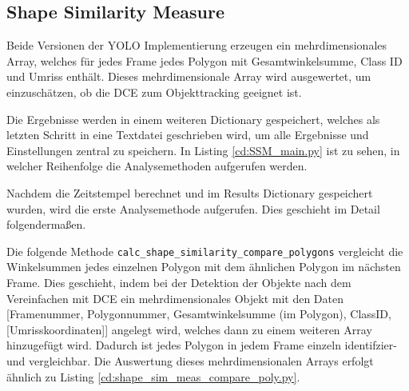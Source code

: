 \subsection{Shape Similarity Measure}{
	\label{py:Shape_Sim_Meas}
	Beide Versionen der YOLO Implementierung erzeugen ein mehrdimensionales Array, welches für jedes Frame jedes Polygon mit Gesamtwinkelsumme, Class ID und Umriss enthält. Dieses mehrdimensionale Array wird ausgewertet, um einzuschätzen, ob die DCE zum Objekttracking geeignet ist. 

	Die Ergebnisse werden in einem weiteren Dictionary gespeichert, welches als letzten Schritt in eine Textdatei geschrieben wird, um alle Ergebnisse und Einstellungen zentral zu speichern. In Listing \ref{cd:SSM_main.py} ist zu sehen, in welcher Reihenfolge die Analysemethoden aufgerufen werden. 
	
	Nachdem die Zeitstempel berechnet und im Results Dictionary gespeichert wurden, wird die erste Analysemethode aufgerufen. Dies geschieht im Detail folgendermaßen.

	Die folgende Methode \lstinline|calc_shape_similarity_compare_polygons| vergleicht die Winkelsummen jedes einzelnen Polygon mit dem ähnlichen Polygon im nächsten Frame. Dies geschieht, indem bei der Detektion der Objekte nach dem Vereinfachen mit DCE ein mehrdimensionales Objekt mit den Daten [Framenummer, Polygonnummer, Gesamtwinkelsumme (im Polygon), ClassID, [Umrisskoordinaten]] angelegt wird, welches dann zu einem weiteren Array hinzugefügt wird. Dadurch ist jedes Polygon in jedem Frame einzeln identifzier- und vergleichbar. 
	Die Auswertung dieses mehrdimensionalen Arrays erfolgt ähnlich zu Listing \ref{cd:shape_sim_meas_compare_poly.py}.\\

}
